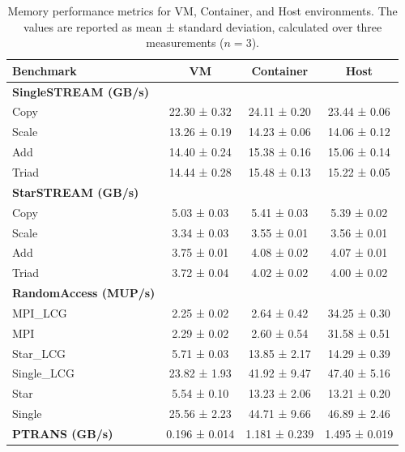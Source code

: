 \begin{table}[htbt]
\centering
\renewcommand{\arraystretch}{1.2}
\begin{tabular}{lccc}
\toprule
\textbf{Benchmark} & \textbf{VM} & \textbf{Container} & \textbf{Host} \\
\midrule
\textbf{SingleSTREAM (GB/s)} & & & \\
Copy   & 22.30 ± 0.32 & 24.11 ± 0.20 & 23.44 ± 0.06 \\
Scale  & 13.26 ± 0.19 & 14.23 ± 0.06 & 14.06 ± 0.12 \\
Add    & 14.40 ± 0.24 & 15.38 ± 0.16 & 15.06 ± 0.14 \\
Triad  & 14.44 ± 0.28 & 15.48 ± 0.13 & 15.22 ± 0.05 \\
\midrule
\textbf{StarSTREAM (GB/s)} & & & \\
Copy   & 5.03 ± 0.03 & 5.41 ± 0.03 & 5.39 ± 0.02 \\
Scale  & 3.34 ± 0.03 & 3.55 ± 0.01 & 3.56 ± 0.01 \\
Add    & 3.75 ± 0.01 & 4.08 ± 0.02 & 4.07 ± 0.01 \\
Triad  & 3.72 ± 0.04 & 4.02 ± 0.02 & 4.00 ± 0.02 \\
\midrule
\textbf{RandomAccess (MUP/s)} & & & \\
MPI\_LCG     & 2.25 ± 0.02 & 2.64 ± 0.42 & 34.25 ± 0.30 \\
MPI          & 2.29 ± 0.02 & 2.60 ± 0.54 & 31.58 ± 0.51 \\
Star\_LCG    & 5.71 ± 0.03 & 13.85 ± 2.17 & 14.29 ± 0.39 \\
Single\_LCG  & 23.82 ± 1.93 & 41.92 ± 9.47 & 47.40 ± 5.16 \\
Star         & 5.54 ± 0.10 & 13.23 ± 2.06 & 13.21 ± 0.20 \\
Single       & 25.56 ± 2.23 & 44.71 ± 9.66 & 46.89 ± 2.46 \\
\midrule
\textbf{PTRANS (GB/s)} & 0.196 ± 0.014 & 1.181 ± 0.239 & 1.495 ± 0.019 \\
\bottomrule
\end{tabular}
\caption{Memory performance metrics for VM, Container, and Host environments. The values are reported as mean ± standard deviation, calculated over three measurements ($n = 3$).}
\label{tab:memory_performance_hpcc}
\end{table}

